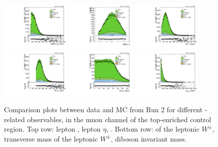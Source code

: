 \begin{figure}[htbp]
  \centering
  \includegraphics[width=0.3\textwidth]{fig/controlPlots/CR_b1_mu_allP_allC_allD_Run2_lnujj_l1_l_pt.pdf}
  \includegraphics[width=0.3\textwidth]{fig/controlPlots/CR_b1_mu_allP_allC_allD_Run2_lnujj_l1_l_eta.pdf}
  \includegraphics[width=0.3\textwidth]{fig/controlPlots/CR_b1_mu_allP_allC_allD_Run2_met_pt.pdf}\\
  \includegraphics[width=0.3\textwidth]{fig/controlPlots/CR_b1_mu_allP_allC_allD_Run2_lnujj_l1_pt.pdf}
  \includegraphics[width=0.3\textwidth]{fig/controlPlots/CR_b1_mu_allP_allC_allD_Run2_lnujj_l1_mt.pdf}
  \includegraphics[width=0.3\textwidth]{fig/controlPlots/CR_b1_mu_allP_allC_allD_Run2_mWV.pdf}\\
  \caption{
    Comparison plots between data and MC from Run 2 for different \Wlep-related observables, in the muon channel of the top-enriched control region.
    Top row: lepton \pt, lepton $\eta$, \ptmiss.
    Bottom row: \pt of the leptonic $W^\pm$, transverse mass of the leptonic $W^\pm$, diboson invariant mass.
  }
  \label{fig:CR_controlPlotsRun2_1}
\end{figure}

